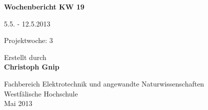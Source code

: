 
\begin{center}
{\Huge \textbf{Wochenbericht KW 19}\par}
\vspace{1cm}
{\Huge 5.5. - 12.5.2013\par}
\vspace{1cm}
{\Huge Projektwoche: 3\par}

\vspace{2cm}

\large{Erstellt durch}\\
\Large{\textbf{Christoph Gnip}}


\vfill

{\normalsize Fachbereich Elektrotechnik und angewandte Naturwissenschaften\\
Westfälische Hochschule\\[2ex]Mai 2013}


\end{center}
\newpage